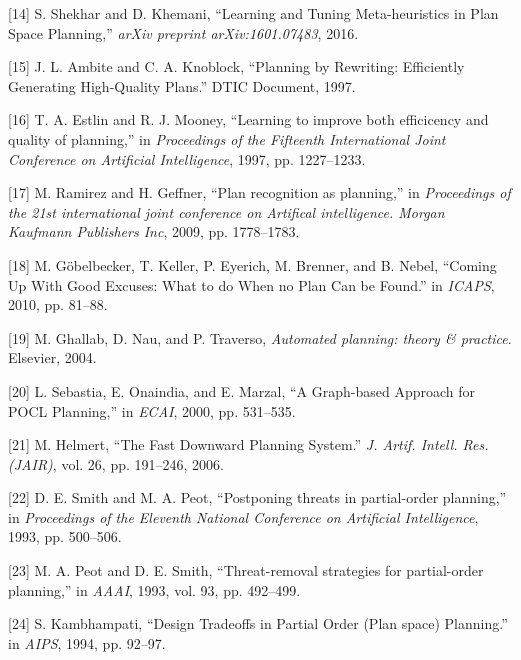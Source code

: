 \hypertarget{ref-shekharux5flearningux5f2016}{}
{[}14{]} S. Shekhar and D. Khemani, ``Learning and Tuning
Meta-heuristics in Plan Space Planning,'' \emph{arXiv preprint
arXiv:1601.07483}, 2016.

\hypertarget{ref-ambiteux5fplanningux5f1997}{}
{[}15{]} J. L. Ambite and C. A. Knoblock, ``Planning by Rewriting:
Efficiently Generating High-Quality Plans.'' DTIC Document, 1997.

\hypertarget{ref-estlinux5flearningux5f1997}{}
{[}16{]} T. A. Estlin and R. J. Mooney, ``Learning to improve both
efficicency and quality of planning,'' in \emph{Proceedings of the
Fifteenth International Joint Conference on Artificial Intelligence},
1997, pp. 1227--1233.

\hypertarget{ref-ramirezux5fplanux5f2009}{}
{[}17{]} M. Ramirez and H. Geffner, ``Plan recognition as planning,'' in
\emph{Proceedings of the 21st international joint conference on
Artifical intelligence. Morgan Kaufmann Publishers Inc}, 2009, pp.
1778--1783.

\hypertarget{ref-gobelbeckerux5fcomingux5f2010}{}
{[}18{]} M. Göbelbecker, T. Keller, P. Eyerich, M. Brenner, and B.
Nebel, ``Coming Up With Good Excuses: What to do When no Plan Can be
Found.'' in \emph{ICAPS}, 2010, pp. 81--88.

\hypertarget{ref-ghallabux5fautomatedux5f2004}{}
{[}19{]} M. Ghallab, D. Nau, and P. Traverso, \emph{Automated planning:
theory \& practice}. Elsevier, 2004.

\hypertarget{ref-sebastiaux5fgraph-basedux5f2000}{}
{[}20{]} L. Sebastia, E. Onaindia, and E. Marzal, ``A Graph-based
Approach for POCL Planning,'' in \emph{ECAI}, 2000, pp. 531--535.

\hypertarget{ref-helmertux5ffastux5f2006}{}
{[}21{]} M. Helmert, ``The Fast Downward Planning System.'' \emph{J.
Artif. Intell. Res.(JAIR)}, vol. 26, pp. 191--246, 2006.

\hypertarget{ref-smithux5fpostponingux5f1993}{}
{[}22{]} D. E. Smith and M. A. Peot, ``Postponing threats in
partial-order planning,'' in \emph{Proceedings of the Eleventh National
Conference on Artificial Intelligence}, 1993, pp. 500--506.

\hypertarget{ref-peotux5fthreatremovalux5f1993}{}
{[}23{]} M. A. Peot and D. E. Smith, ``Threat-removal strategies for
partial-order planning,'' in \emph{AAAI}, 1993, vol. 93, pp. 492--499.

\hypertarget{ref-kambhampatiux5fdesignux5f1994}{}
{[}24{]} S. Kambhampati, ``Design Tradeoffs in Partial Order (Plan
space) Planning.'' in \emph{AIPS}, 1994, pp. 92--97.
